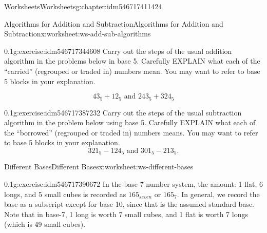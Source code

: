 \documentclass[twoside,11pt,]{book}
\begin{document}
\begin{chapterptx}{Worksheets}{}{Worksheets}{}{}{g:chapter:idm546717411424}
\restoregeometry
%
%
\typeout{************************************************}
\typeout{************************************************}
%
\begin{worksheet-section-numberless}{Algorithms for Addition and Subtraction}{}{Algorithms for Addition and Subtraction}{}{}{x:worksheet:ws-add-sub-algorithms}
\begin{divisionexercise}{1}{}{0.1}{g:exercise:idm546717344608}%
Carry out the steps of the usual addition algorithm in the problems below in base 5.  Carefully EXPLAIN what each of the ``carried'' (regrouped or traded in) numbers mean.  You may want to refer to base 5 blocks in your explanation.%
\par
%
\begin{equation*}
43_{5}+12_{5} \text{ and } 243_{5}+324_{5}
\end{equation*}
%
\end{divisionexercise}%
\clearpage
\begin{divisionexercise}{2}{}{0.1}{g:exercise:idm546717387232}%
Carry out the steps of the usual subtraction algorithm in the problem below using base 5.  Carefully EXPLAIN what each of the ``borrowed'' (regrouped or traded in) numbers means.  You may want to refer to base 5 blocks in your explanation.%
\begin{equation*}
321_{5}-124_5 \text{ and } 301_5-213_5 \text{.}
\end{equation*}
%
\end{divisionexercise}%
\end{worksheet-section-numberless}
\restoregeometry
%
%
\typeout{************************************************}
\typeout{************************************************}
%
\begin{worksheet-section-numberless}{Different Bases}{}{Different Bases}{}{}{x:worksheet:ws-different-bases}
\begin{divisionexercise}{1}{}{0.1}{g:exercise:idm546717390672}%
In the base-7 number system, the amount: 1 flat, 6 longs, and 5 small cubes is recorded as \(165_{seven}\) or \(165_7\). In general, we record the base as a subscript except for base 10, since that is the assumed standard base.  Note that in base-7, 1 long is worth 7 small cubes, and 1 flat is worth 7 longs (which is 49 small cubes).%
\par

\end{divisionexercise}
\end{worksheet-section-numberless}
\end{chapterptx}
\end{document}

